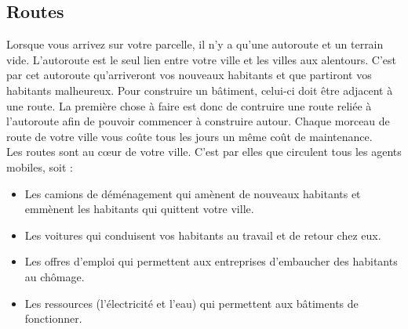 \documentclass[11pt]{report}
\begin{document}


\newpage
\subsection{Routes}
Lorsque vous arrivez sur votre parcelle, il n'y a qu'une autoroute et un terrain vide.
L'autoroute est le seul lien entre votre ville et les villes aux alentours. C'est par cet autoroute qu'arriveront vos nouveaux habitants et que partiront vos habitants malheureux.
Pour construire un bâtiment, celui-ci doit être adjacent à une route. La première chose à faire est donc de contruire une route reliée à l'autoroute afin de pouvoir commencer à construire autour.
Chaque morceau de route de votre ville vous coûte tous les jours un même coût de maintenance.\\
Les routes sont au cœur de votre ville. C'est par elles que circulent tous les agents mobiles, soit :
\begin{itemize}
	\item Les camions de déménagement qui amènent de nouveaux habitants et emmènent les habitants qui quittent votre ville.
	\item Les voitures qui conduisent vos habitants au travail et de retour chez eux.
	\item Les offres d'emploi qui permettent aux entreprises d'embaucher des habitants au chômage.
	\item Les ressources (l'électricité et l'eau) qui permettent aux bâtiments de fonctionner.
\end{itemize}
\end{document}
